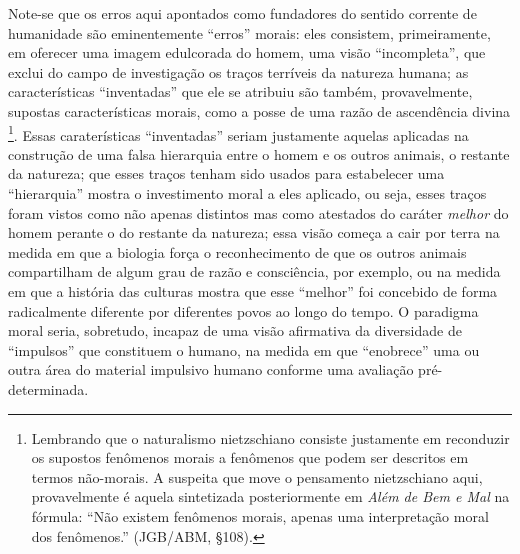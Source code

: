 \documentclass[
	12pt,				%
	openright,			%
	oneside,			%
	a4paper,			%
	english,			%
	french,				%
	spanish,			%
	brazil				%
	]{abntex2}
\begin{document}
Note-se que os erros aqui apontados como fundadores do sentido corrente de humanidade são eminentemente “erros” morais: eles consistem, primeiramente, em oferecer uma imagem edulcorada do homem, uma visão “incompleta”, que exclui do campo de investigação os traços terríveis da natureza humana; as características “inventadas” que ele se atribuiu são também, provavelmente, supostas características morais, como a posse de uma razão de ascendência divina
\footnote{Lembrando que o naturalismo nietzschiano consiste justamente em reconduzir os supostos fenômenos morais a fenômenos que podem ser descritos em termos não-morais. A suspeita que move o pensamento nietzschiano aqui, provavelmente é aquela sintetizada posteriormente em \textit{Além de Bem e Mal} na fórmula: “Não existem fenômenos morais, apenas uma interpretação moral dos fenômenos.” (JGB/ABM, §108).}. 
Essas caraterísticas “inventadas” seriam justamente aquelas aplicadas na construção de uma falsa hierarquia entre o homem e os outros animais, o restante da natureza; que esses traços tenham sido usados para estabelecer uma “hierarquia” mostra o investimento moral a eles aplicado, ou seja, esses traços foram vistos como não apenas distintos mas como atestados do caráter \textit{melhor} do homem perante o do restante da natureza; essa visão começa a cair por terra na medida em que a biologia força o reconhecimento de que os outros animais compartilham de algum grau de razão e consciência, por exemplo, ou na medida em que a história das culturas mostra que esse “melhor” foi concebido de forma radicalmente diferente por diferentes povos ao longo do tempo. O paradigma moral seria, sobretudo, incapaz de uma visão afirmativa da diversidade de “impulsos” que constituem o humano, na medida em que “enobrece” uma ou outra área do material impulsivo humano conforme uma avaliação pré-determinada.
\end{document}
